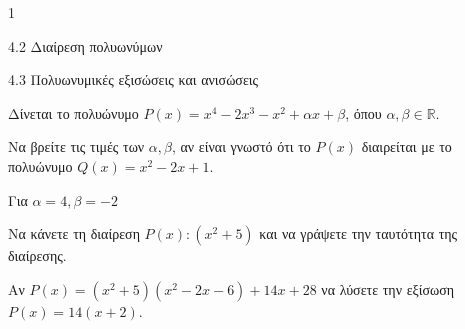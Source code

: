 \begin{ylh}{1}
\item 4.2 Διαίρεση πολυωνύμων
\item 4.3 Πολυωνυμικές εξισώσεις και ανισώσεις
\end{ylh}
Δίνεται το πολυώνυμο $P(x) = x^4 - 2x^3 - x^2 + \alpha x + \beta$, όπου $\alpha, \beta \in \mathbb{R}$.
\begin{alist}
\item Να βρείτε τις τιμές των $\alpha, \beta$, αν είναι γνωστό ότι το $P(x)$ διαιρείται με το πολυώνυμο $Q(x) = x^2 - 2x + 1$.
\item Για $\alpha = 4, \beta = -2$
\begin{rlist}
\item Να κάνετε τη διαίρεση $P(x) : (x^2 + 5)$ και να γράψετε την ταυτότητα της διαίρεσης.
\item Αν $P(x) = (x^2 + 5)(x^2 - 2x - 6) + 14x + 28$ να λύσετε την εξίσωση $P(x) = 14(x + 2)$.
\end{rlist}
\end{alist}


